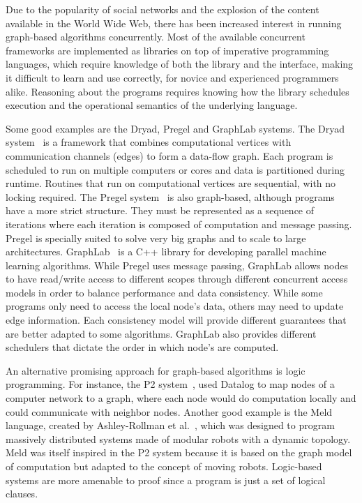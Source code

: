 
Due to the popularity of social networks and the explosion of the content available in the World Wide Web, there has been
increased interest in running graph-based algorithms concurrently. Most of the available concurrent frameworks are implemented as libraries on top
of imperative programming languages, which require knowledge of both the library and the interface, making it difficult to learn and use correctly, for novice and experienced programmers alike.
Reasoning about the programs requires knowing how
the library schedules execution and the operational semantics of the underlying language.

Some good examples are the Dryad, Pregel and GraphLab systems.
The Dryad system~\cite{Isard:2007:DDD:1272996.1273005} is a framework that combines computational vertices
with communication channels (edges) to form a data-flow graph. Each program is scheduled to
run on multiple computers or cores and data is partitioned during runtime. Routines that run on computational vertices
are sequential, with no locking required.
The Pregel system~\cite{Malewicz:2010:PSL:1807167.1807184} is also graph-based, although programs have a more strict
structure. They must be represented as a sequence of iterations where each iteration is composed of computation and message passing.
Pregel is specially suited to solve very big graphs
and to scale to large architectures. GraphLab~\cite{GraphLab2010} is a C++ library for developing parallel machine learning algorithms. While
Pregel uses message passing, GraphLab allows nodes to have read/write access to different scopes through different concurrent access models in order to balance performance and data consistency. While some programs only need to access the local node's data, others may need to update edge information. Each consistency model will provide different guarantees that are better adapted to some algorithms. GraphLab also provides different schedulers that dictate the order in which node's are computed.

An alternative promising approach for graph-based algorithms 
is logic programming. For instance, the P2 system~\cite{Loo-condie-garofalakis-p2}, used Datalog to map nodes of a computer network
to a graph, where each node would do computation locally and could communicate with neighbor nodes.
Another good example is the Meld language, created by
Ashley-Rollman et al.~\cite{ashley-rollman-derosa-iros07wksp,ashley-rollman-iclp09}, which was designed to
program massively distributed systems made of modular robots with a dynamic topology. Meld was itself inspired
in the P2 system because it is based on the graph model of computation but adapted to the concept of moving
robots.
Logic-based systems are more amenable to proof since a program is just a set of logical clauses.

